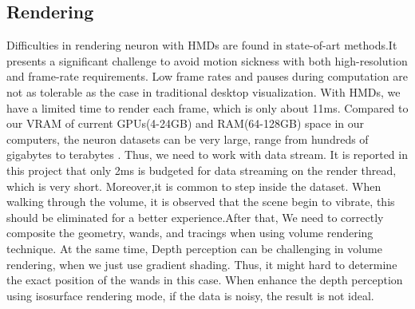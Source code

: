 \documentclass[10pt,twocolumn,letterpaper]{article}
\begin{document}
\subsection{Rendering}
Difficulties in rendering neuron with HMDs are found in state-of-art methods.It presents a significant challenge to avoid motion sickness with both high-resolution and frame-rate requirements. Low frame rates and pauses during computation are not as tolerable as the case in traditional desktop visualization. With HMDs, we have a limited time to render each frame, which is only about 11ms. Compared to our VRAM of current GPUs(4-24GB) and RAM(64-128GB) space in our computers, the neuron datasets can be very large, range from hundreds of gigabytes to terabytes \cite{Usher2018}. Thus, we need to work with data stream. It is reported in this project that only 2ms is budgeted for data streaming on the render thread, which is very short. Moreover,it is common to step inside the dataset. When walking through the volume, it is observed that the scene begin to vibrate, this should be eliminated for a better experience.After that, We need to correctly composite the geometry, wands, and tracings when using volume rendering technique. At the same time, Depth perception can be challenging in volume rendering, when we just use gradient shading. Thus, it might hard to determine the exact position of the wands in this case. When enhance the depth perception using isosurface rendering mode, if the data is noisy, the result is not ideal.
\end{document}
